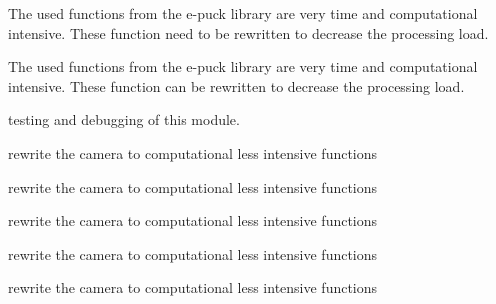 
\begin{DoxyRefList}
\item[\label{todo__todo000005}%
\hypertarget{todo__todo000005}{}%
Module \hyperlink{group__camera}{camera} ]The used functions from the e-\/puck library are very time and computational intensive. These function need to be rewritten to decrease the processing load. 
\item[\label{todo__todo000001}%
\hypertarget{todo__todo000001}{}%
File \hyperlink{camera_8c}{camera.c} ]The used functions from the e-\/puck library are very time and computational intensive. These function can be rewritten to decrease the processing load.  
\item[\label{todo__todo000006}%
\hypertarget{todo__todo000006}{}%
Module \hyperlink{group__i2c}{i2c} ]testing and debugging of this module. 
\item[\label{todo__todo000004}%
\hypertarget{todo__todo000004}{}%
global\+Scope$>$ Global \hyperlink{camera_8c_a559013ac1bda7cdf1b2518bacd32e0e7}{Sys\+\_\+\+Camera\+\_\+\+Pre\+Processor} (void)]rewrite the camera to computational less intensive functions 
\item[\label{todo__todo000002}%
\hypertarget{todo__todo000002}{}%
global\+Scope$>$ Global \hyperlink{camera_8h_aeefbe8dd86aa2b4588e5e5aa596d41fe}{Sys\+\_\+\+Init\+\_\+\+Camera} (void)]rewrite the camera to computational less intensive functions 
\item[\label{todo__todo000002}%
\hypertarget{todo__todo000002}{}%
global\+Scope$>$ Global \hyperlink{camera_8h_aeefbe8dd86aa2b4588e5e5aa596d41fe}{Sys\+\_\+\+Init\+\_\+\+Camera} (void)]rewrite the camera to computational less intensive functions 
\item[\label{todo__todo000003}%
\hypertarget{todo__todo000003}{}%
global\+Scope$>$ Global \hyperlink{camera_8h_ac44e432642eee885441e01f976e2c969}{Sys\+\_\+\+Start\+\_\+\+Camera} (void)]rewrite the camera to computational less intensive functions 
\item[\label{todo__todo000003}%
\hypertarget{todo__todo000003}{}%
global\+Scope$>$ Global \hyperlink{camera_8h_ac44e432642eee885441e01f976e2c969}{Sys\+\_\+\+Start\+\_\+\+Camera} (void)]rewrite the camera to computational less intensive functions
\end{DoxyRefList}